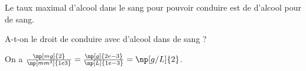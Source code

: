 \finEntrainement





\hauteurLargeurCadreReponse		{8mm}{2cm}
\initialisationEntrainement

Le taux maximal d’alcool dans le sang pour pouvoir conduire est de  d’alcool pour  de sang. 

\debutEntrainement


\begin{enonce}
A-t-on le droit de conduire avec  d’alcool dans   de sang ?
\end{enonce}


\begin{corrige}
On a $\frac{\np[mg]{2}}{\np[mm^3]{1e3}} = \frac{\np[g]{2e-3}}{\np[L]{1e-3}} = \np[g/L]{2}$.
\end{corrige}


\finEntrainement







